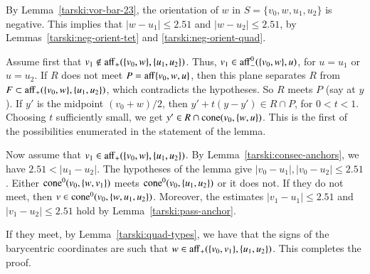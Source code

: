 \begin{tarskidata}
\begin{tarski}
\begin{proved}
By Lemma~\ref{tarski:vor-bar-23}, the orientation
of $w$ in $S=\{v_0,w,u_1,u_2\}$ is negative.  This implies that
$|w-u_1|\le 2.51$ and  $|w-u_2|\le 2.51$, by
 Lemmas~\ref{tarski:neg-orient-tet} and \ref{tarski:neg-orient-quad}. 


Assume first that 
$v_1\not\in {\operatorname{aff}}_+(\{v_0,w\},\{u_1,u_2\})$.  
Thus, $v_1\in {\operatorname{aff}}_-^0(\{v_0,w\},u)$, for $u=u_1$ or $u=u_2$.
If $R$ does not meet $P={\operatorname{aff}}\{v_0,w,u\}$, then this plane separates
$R$ from $F\subset {\operatorname{aff}}_+(\{v_0,w\},\{u_1,u_2\})$, which contradicts
the hypotheses.  So $R$ meets $P$ (say at $y$).  
If $y'$ is the midpoint $(v_0+w)/2$, then
$y' + t (y - y')\in R\cap P$, for $0<t<1$.  Choosing $t$ sufficiently
small, we get $y'\in R\cap {\operatorname{cone}}(v_0,\{w,u\})$.
This is the first of the possibilities enumerated in the statement
of the lemma.

Now assume that
$v_1\in {\operatorname{aff}}_+(\{v_0,w\},\{u_1,u_2\})$.  
By Lemma~\ref{tarski:consec-anchors}, we have $2.51<|u_1-u_2|$.
The hypotheses of the lemma give $|v_0-u_1|,|v_0-u_2|\le 2.51$.
Either ${\operatorname{cone}}^0(v_0,\{w,v_1\})$ meets ${\operatorname{cone}}^0(v_0,\{u_1,u_2\})$
or it does not.  If they do not meet, then
$v\in{\operatorname{cone}}^0(v_0,\{w,u_1,u_2\})$.  Moreover, the
estimates $|v_1-u_1|\le 2.51$ and $|v_1-u_2|\le 2.51$ hold
by Lemma~\ref{tarski:pass-anchor}.  %

If they meet, by Lemma~\ref{tarski:quad-types}, we have that
the signs of the barycentric coordinates are such that
$w\in{\operatorname{aff}}_+(\{v_0,v_1\},\{u_1,u_2\})$.  This completes the proof.
\swallowed\end{proved}
\end{tarski}






\begin{tarski}


\end{tarski}
\end{tarskidata}
